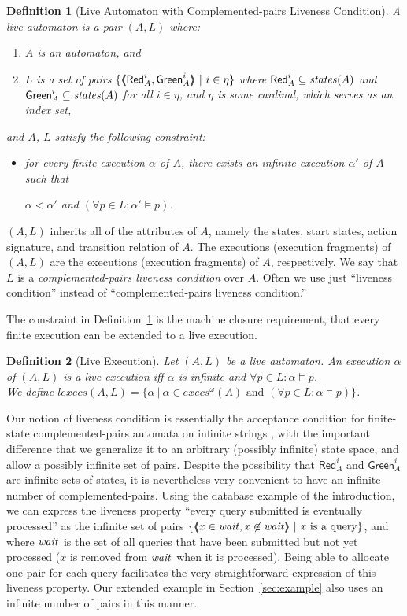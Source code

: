 \documentclass[11pt]{article}
\newcommand{\be}{\begin{itemize}}
\newcommand{\ee}{\end{itemize}}
\newcommand{\bn}{\begin{enumerate}}
\newcommand{\en}{\end{enumerate}}
\newcommand{\bd}{\begin{definition}}
\newcommand{\ed}{\end{definition}}
\newcommand{\intrdef}{\emph}	\newcommand{\intr}{\emph}
\newcommand{\fa}{\forall}
\newcommand{\sat}{\models}
\newcommand{\GREEN}{\mathsf{Green}}
\newcommand{\RED}{\mathsf{Red}}
\newcommand{\pair}[2]{\lpb #1, #2 \rpb}
\newcommand{\lpb}{\langle \hspace{-0.34em} \langle \hspace{-0.34em} \langle}
\newcommand{\rpb}{\rangle \hspace{-0.34em} \rangle \hspace{-0.34em} \rangle}
\newcommand{\al}{\alpha}
\newcommand{\execs}{\mathit{lexecs}}
\newcommand{\iexecs}{\mathit{execs}^\omega}
\newcommand{\states}{\mathit{states}}
\newtheorem{definition}{Definition}
\newcommand{\ms}[1]{\relax\ifmmode
                \mathord{\mathcode`\-="702D\it #1\mathcode`\-="2200}\else
{\it #1}\fi
}
\newcommand{\statevar}[1]{\ms{#1}}
\newcommand{\wait}{\statevar{wait}}
\begin{document}
\bd[Live Automaton with Complemented-pairs Liveness Condition] 
\label{def:live-automaton}
A \intrdef{live automaton} is a pair $(A,L)$ where:
\bn

\item $A$ is an automaton, and

\item $L$ is a set of pairs
$\{ \pair{\RED_A^i}{\GREEN_A^i} ~|~ i \in \eta\}$
where $\RED_A^i \sub \states(A)$ and $\GREEN_A^i \sub \states(A)$ for
all $i \in \eta$, and $\eta$ is some cardinal, which serves as an
index set,

\en

and $A$, $L$ satisfy the following constraint:

\be
\item for every finite execution $\al$ of $A$, there exists an infinite
execution $\al'$ of $A$ such that

$\al < \al'$ and $(\fa p \in L: \al' \sat p)$.

\ee
\ed
$(A,L)$ inherits all of the attributes of $A$, namely the states,
start states, action signature, and transition relation of $A$. 
The executions (execution fragments) of $(A,L)$ are the executions
(execution fragments) of $A$, respectively. 
We say that $L$ is a \emph{complemented-pairs liveness condition} over $A$.
Often we use just ``liveness condition'' instead of 
``complemented-pairs liveness condition.''

The constraint in Definition~\ref{def:live-automaton} is the machine
closure requirement, that every finite execution can be extended to a
live execution.



\bd[Live Execution]
\label{def:live-execution}
Let $(A,L)$ be a live automaton. An execution $\al$ of $(A,L)$ is a
\intrdef{live execution} iff $\al$ is infinite and $\fa p \in L: \al \sat p$.\\
We define $\execs(A,L) = \{\al ~|~ \al \in \iexecs(A) \mbox{ and } 
(\fa p \in L: \al \sat p)\}$.
\ed





Our notion of liveness condition is essentially the acceptance condition for
finite-state complemented-pairs automata on infinite strings
\cite{EL85}, with the important difference that we generalize it to an
arbitrary (possibly infinite) state space, and allow a possibly
infinite set of pairs. 
Despite the possibility that $\RED_A^i$ and
$\GREEN_A^i$ are infinite sets of states, it is nevertheless very
convenient to have an infinite number of complemented-pairs.  Using the database
example of the introduction, we can express the 
liveness property ``every query submitted is eventually processed'' as the
infinite set of pairs 
$\{ \pair{x \in \wait}{x \not\in \wait} ~|~ \mbox{$x$ is a query} \}$, 
and where $\wait$ is the set of all queries that have been submitted
but not yet processed ($x$ is removed from $\wait$ when it is processed).
Being able to allocate one pair for each query facilitates the very
straightforward expression of this liveness property.
Our extended example in Section~\ref{sec:example} also uses an
infinite number of pairs in this manner.
\end{document}
